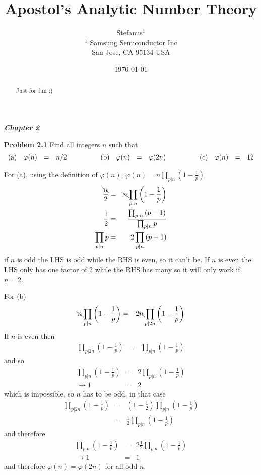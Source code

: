 \documentclass[aps,preprint,preprintnumbers,nofootinbib,showpacs,prd]{revtex4-1}
\newcommand{\nbea}{\begin{eqnarray*}}
\newcommand{\neea}{\end{eqnarray*}}
\begin{document}
\title{Apostol's Analytic Number Theory}
\bigskip
\author{Stefanus$^1$\\
$^1$ Samsung Semiconductor Inc\\ San Jose, CA 95134 USA\\
}
%
\date{\today}
%
\begin{abstract}
Just for fun :)

\end{abstract}
%
\maketitle

\renewcommand{\theequation}{A.\arabic{equation}}  %
\setcounter{equation}{0}  %

\underline{\textbf{\textit{Chapter 2}}}
\bigskip

{\bf Problem 2.1} Find all integers $n$ such that
%
\nbea
\begin{array}{l r c l c l r c l c l r c l}
{\rm(a)} & \varphi(n) & = & n/2 & ~~~~~~~~~ & {\rm(b)} & \varphi(n) & = & \varphi(2n) & ~~~~~~~~~ & {\rm(c)} & \varphi(n) & = & 12
\end{array}
\neea
%

For (a), using the definition of $\varphi(n)$, $\varphi(n) = n \prod_{p|n} \left ( 1 - \frac{1}{p} \right )$
%
\nbea
\frac{\bcancel{n}}{2} & = & \bcancel{n} \prod_{p|n} \left ( 1 - \frac{1}{p} \right ) \\
\frac{1}{2} & = & \frac{\prod_{p|n} \left ( p - 1 \right )}{\prod_{p|n} p} \\
\prod_{p|n} p & = & 2\prod_{p|n} \left ( p - 1 \right )
\neea
%
if $n$ is odd the LHS is odd while the RHS is even, so it can't be. If $n$ is even the LHS only has one factor of 2 while the RHS has many so it will only work if $n=2$.

For (b)
%
\nbea
\bcancel{n} \prod_{p|n} \left ( 1 - \frac{1}{p} \right )  & = & 2\bcancel{n} \prod_{p|2n} \left ( 1 - \frac{1}{p} \right )
\neea
%
If $n$ is even then
%
\nbea
\prod_{p|2n} \left ( 1 - \frac{1}{p} \right ) & = & \prod_{p|n} \left ( 1 - \frac{1}{p} \right )
\neea
%
and so
%
\nbea
\prod_{p|n} \left ( 1 - \frac{1}{p} \right )  & = & 2\prod_{p|n} \left ( 1 - \frac{1}{p} \right ) \\
\to 1 & = & 2
\neea
%
which is impossible, so $n$ has to be odd, in that case
%
\nbea
\prod_{p|2n} \left ( 1 - \frac{1}{p} \right ) & = & \left ( 1 - \frac{1}{2} \right ) \prod_{p|n} \left ( 1 - \frac{1}{p} \right ) \\
& = & \frac{1}{2} \prod_{p|n} \left ( 1 - \frac{1}{p} \right )
\neea
%
and therefore
%
\nbea
\prod_{p|n} \left ( 1 - \frac{1}{p} \right )  & = & 2 \frac{1}{2} \prod_{p|n} \left ( 1 - \frac{1}{p} \right ) \\
\to 1 & = & 1
\neea
%
and therefore $\varphi(n) = \varphi(2n)$ for all odd $n$.
\end{document}

